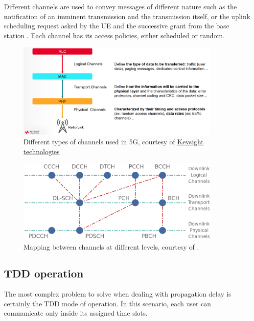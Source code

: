 Different channels are used to convey messages of different nature such as the notification of an imminent transmission and the transmission itself, or the uplink scheduling request asked by the \ac{UE} and the successive grant from the base station \cite{5g-mac-devopedia}. Each channel has its access policies, either scheduled or random.

\begin{figure}[ht]
    \centering
    \includegraphics[width=0.9\textwidth]{res/nr-types-channels.png}
    \caption{Different types of channels used in 5G, courtesy of \href{https://www.keysight.com/}{Keysight technologies}}
    \label{fig:nr-types-channels}
\end{figure}

\begin{figure}[ht]
    \centering
    \includegraphics[width=0.9\textwidth]{res/channels.png}
    \caption{Mapping between channels at different levels, courtesy of \cite{5g-ch-devopedia}.}
    \label{fig:nr-channel-mapping}
\end{figure}

\subsection{TDD operation}
The most complex problem to solve when dealing with propagation delay is certainly the \ac{TDD} mode of operation. In this scenario, each user can communicate only inside its assigned time slots.

